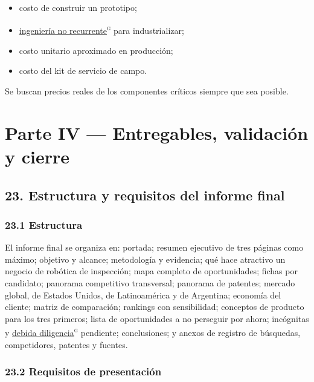 \documentclass[11pt,a4paper]{article}
\begin{document}
\begin{itemize}
\item costo de construir un prototipo;
\item \hyperlink{g-nre}{ingeniería no recurrente}\textsuperscript{\textsc{g}} para industrializar;
\item costo unitario aproximado en producción;
\item costo del kit de servicio de campo.
\end{itemize}

Se buscan precios reales de los componentes críticos siempre que sea posible.

\clearpage

\section*{Parte IV — Entregables, validación y cierre}


\subsection*{23. Estructura y requisitos del informe final}


\subsubsection*{23.1 Estructura}

El informe final se organiza en: portada; resumen ejecutivo de tres páginas como máximo; objetivo y alcance; metodología y evidencia; qué hace atractivo un negocio de robótica de inspección; mapa completo de oportunidades; fichas por candidato; panorama competitivo transversal; panorama de patentes; mercado global, de Estados Unidos, de Latinoamérica y de Argentina; economía del cliente; matriz de comparación; rankings con sensibilidad; conceptos de producto para los tres primeros; lista de oportunidades a no perseguir por ahora; incógnitas y \hyperlink{g-due-diligence}{debida diligencia}\textsuperscript{\textsc{g}} pendiente; conclusiones; y anexos de registro de búsquedas, competidores, patentes y fuentes.


\subsubsection*{23.2 Requisitos de presentación}
\end{document}
